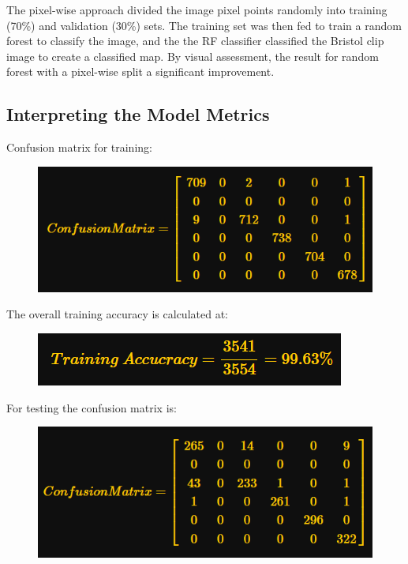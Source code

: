 \documentclass[
  letterpaper,
  DIV=11,
  numbers=noendperiod]{scrreprt}
\begin{document}
The pixel-wise approach divided the image pixel points randomly into
training (70\%) and validation (30\%) sets. The training set was then
fed to train a random forest to classify the image, and the the RF
classifier classified the Bristol clip image to create a classified map.
By visual assessment, the result for random forest with a pixel-wise
split a significant improvement.

\hypertarget{interpreting-the-model-metrics}{%
\subsection*{Interpreting the Model
Metrics}\label{interpreting-the-model-metrics}}

Confusion matrix for training:

\begin{figure}

{\centering \includegraphics{images/wk7/confusion_matrix_train.png}

}

\end{figure}

The overall training accuracy is calculated at:

\begin{figure}

{\centering \includegraphics{images/wk7/training_accu.png}

}

\end{figure}

For testing the confusion matrix is:

\begin{figure}

{\centering \includegraphics{images/wk7/confusion_matrix_test.png}

}

\end{figure}
\end{document}
